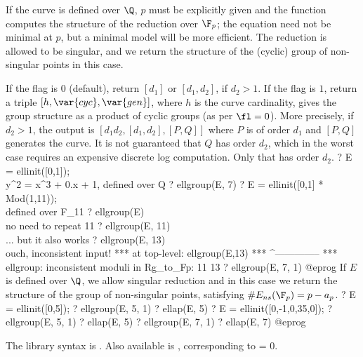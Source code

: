 If the curve is defined over $\Q$, $p$ must be explicitly given and the
function computes the structure of the reduction over $\F_p$; the
equation need not be minimal at $p$, but a minimal model will be more
efficient. The reduction is allowed to be singular, and we return the
structure of the (cyclic) group of non-singular points in this case.

If the flag is $0$ (default), return $[d_1]$ or $[d_1, d_2]$, if $d_2>1$.
If the flag is $1$, return a triple $[h,\var{cyc},\var{gen}]$, where
$h$ is the curve cardinality,  gives the group structure as a
product of cyclic groups (as per $\fl = 0$). More precisely, if $d_2 > 1$,
the output is $[d_1d_2, [d_1,d_2],[P,Q]]$ where $P$ is
of order $d_1$ and $[P,Q]$ generates the curve.
 It is not guaranteed that $Q$ has order $d_2$, which in
the worst case requires an expensive discrete log computation. Only that
 has order $d_2$.
\bprog
? E = ellinit([0,1]);  \\ y^2 = x^3 + 0.x + 1, defined over Q
? ellgroup(E, 7)
? E = ellinit([0,1] * Mod(1,11));  \\ defined over F_11
? ellgroup(E)   \\ no need to repeat 11
? ellgroup(E, 11)   \\ ... but it also works
? ellgroup(E, 13) \\ ouch, inconsistent input!
   ***   at top-level: ellgroup(E,13)
   ***                 ^--------------
   *** ellgroup: inconsistent moduli in Rg_to_Fp:
     11
     13
? ellgroup(E, 7, 1)
@eprog\noindent
If $E$ is defined over $\Q$, we allow singular reduction and in this case we
return the structure of the group of non-singular points, satisfying
$\#E_{ns}(\F_p) = p - a_p$.
\bprog
? E = ellinit([0,5]);
? ellgroup(E, 5, 1)
? ellap(E, 5)
? E = ellinit([0,-1,0,35,0]);
? ellgroup(E, 5, 1)
? ellap(E, 5)
? ellgroup(E, 7, 1)
? ellap(E, 7)
@eprog

The library syntax is .
Also available is , corresponding
to \fl = 0.

